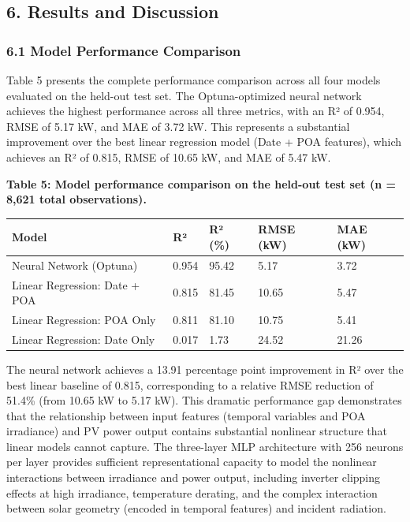 \documentclass[
  11pt,
]{article}
\newcounter{none} %
\begin{document}
\subsection{6. Results and Discussion}\label{results-and-discussion}

\subsubsection{6.1 Model Performance
Comparison}\label{model-performance-comparison}

Table 5 presents the complete performance comparison across all four
models evaluated on the held-out test set. The Optuna-optimized neural
network achieves the highest performance across all three metrics, with
an R² of 0.954, RMSE of 5.17 kW, and MAE of 3.72 kW. This represents a
substantial improvement over the best linear regression model (Date +
POA features), which achieves an R² of 0.815, RMSE of 10.65 kW, and MAE
of 5.47 kW.

\textbf{Table 5: Model performance comparison on the held-out test set
(n = 8,621 total observations).}

{\def\LTcaptype{none} %
\begin{longtable}[]{@{}lllll@{}}
\toprule\noalign{}
Model & R² & R² (\%) & RMSE (kW) & MAE (kW) \\
\midrule\noalign{}
\endhead
\bottomrule\noalign{}
\endlastfoot
Neural Network (Optuna) & 0.954 & 95.42 & 5.17 & 3.72 \\
Linear Regression: Date + POA & 0.815 & 81.45 & 10.65 & 5.47 \\
Linear Regression: POA Only & 0.811 & 81.10 & 10.75 & 5.41 \\
Linear Regression: Date Only & 0.017 & 1.73 & 24.52 & 21.26 \\
\end{longtable}
}

The neural network achieves a 13.91 percentage point improvement in R²
over the best linear baseline of 0.815, corresponding to a relative RMSE
reduction of 51.4\% (from 10.65 kW to 5.17 kW). This dramatic
performance gap demonstrates that the relationship between input
features (temporal variables and POA irradiance) and PV power output
contains substantial nonlinear structure that linear models cannot
capture. The three-layer MLP architecture with 256 neurons per layer
provides sufficient representational capacity to model the nonlinear
interactions between irradiance and power output, including inverter
clipping effects at high irradiance, temperature derating, and the
complex interaction between solar geometry (encoded in temporal
features) and incident radiation.
\end{document}
